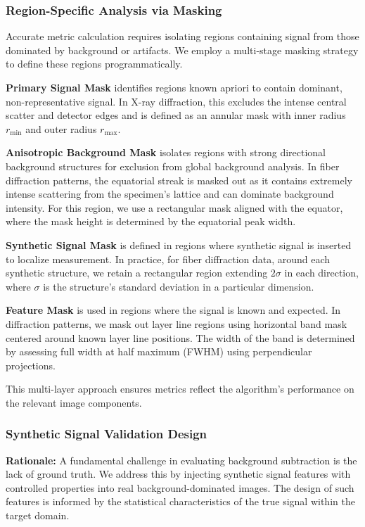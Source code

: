 \documentclass[iucr,review]{iucrjournals}
\begin{document}
\subsubsection{Region-Specific Analysis via Masking}
Accurate metric calculation requires isolating regions containing signal from those dominated by background or artifacts.
We employ a multi-stage masking strategy to define these regions programmatically.

\textbf{Primary Signal Mask} identifies regions known apriori to contain dominant, non-representative signal.
In X-ray diffraction, this excludes the intense central scatter and detector edges and is defined
as an annular mask with inner radius $r_{\mathrm{min}}$ and outer radius $r_{\mathrm{max}}$.

\textbf{Anisotropic Background Mask} isolates regions with strong directional background structures
for exclusion from global background analysis.
In fiber diffraction patterns, the equatorial streak is masked out as
it contains extremely intense scattering from the specimen's lattice and
can dominate
background intensity.
For this region,
we use a rectangular mask aligned with the equator,
where the mask height is determined by the equatorial peak width.

\textbf{Synthetic Signal Mask} is defined in regions where synthetic signal is inserted to localize measurement.
In practice, for fiber diffraction data, around each synthetic structure, we retain a rectangular region extending
$2 \sigma$ in each direction, where $\sigma$ is
the structure's standard deviation in a particular dimension.

\textbf{Feature Mask} is used in regions where the signal is known and expected. 
In diffraction patterns, we mask out layer line regions using horizontal band mask centered around known layer line positions.
The width of the band is determined by assessing full width at half maximum (FWHM) 
using perpendicular projections. 

This multi-layer approach ensures metrics reflect the algorithm's performance on the relevant image components.


\subsubsection{Synthetic Signal Validation Design}
\textbf{Rationale:}
A fundamental challenge in evaluating background subtraction is the lack of ground truth.
We address this by injecting synthetic signal features with controlled properties into real background-dominated images.
The design of such features is informed by the statistical characteristics of the true signal within the target domain.
\end{document}
